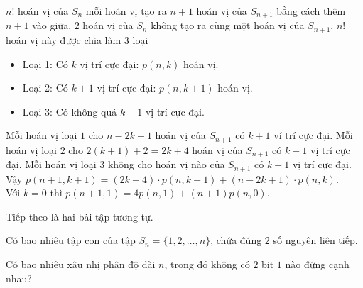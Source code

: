 \begin{bt}
{		$n!$ hoán vị của $S_n$ mỗi hoán vị tạo ra $n+1$ hoán vị của $S_{n+1}$ bằng cách thêm $n+1$ vào giữa, $2$ hoán vị của $S_n$ không tạo ra cùng một hoán vị của $S_{n+1}$, $n!$ hoán vị này được chia làm $3$ loại
		\begin{itemize}
			\item Loại 1: Có $k$ vị trí cực đại: $p(n,k)$ hoán vị.
			\item Loại 2: Có $k+1$ vị trí cực đại: $p(n,k+1)$ hoán vị.
			\item Loại 3: Có không quá $k-1$ vị trí cực đại.
		\end{itemize}
		Mỗi hoán vị loại $1$ cho $n-2k-1$ hoán vị của $S_{n+1}$ có $k+1$ ví trí cực đại.
		Mỗi hoán vị loại $2$ cho $2(k+1)+2=2k+4$ hoán vị của $S_{n+1}$ có $k+1$ vị trí cực đại. Mỗi hoán vị loại $3$ không cho hoán vị nào của $S_{n+1}$ có $k+1$ vị trí cực đại.\\
		Vậy $p(n+1,k+1)=(2k+4)\cdot p(n,k+1)+(n-2k+1)\cdot p(n,k)$.\\
		Với $k=0$ thì $p(n+1,1)=4p(n,1)+(n+1)p(n,0)$.
		
	}
\end{bt}
Tiếp theo là hai bài tập tương tự.	
\begin{bt}%
	Có bao nhiêu tập con của tập $S_n=\{1,2,\ldots,n\}$, chứa đúng $2$ số nguyên liên tiếp.
\end{bt}
\begin{bt}%
	Có bao nhiêu xâu nhị phân độ dài $n$, trong đó không có $2$ bit $1$ nào đứng cạnh nhau?
\end{bt}

